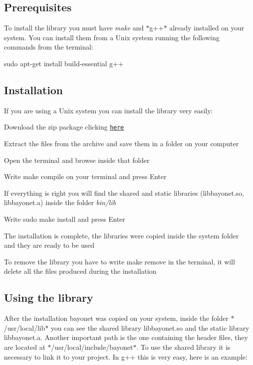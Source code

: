 \subsection*{Prerequisites }

To install the library you must have {\itshape make} and $\ast$g++$\ast$ already installed on your system. You can install them from a Unix system running the following commands from the terminal\-:

{\ttfamily sudo apt-\/get install build-\/essential g++}

\subsection*{Installation }

If you are using a Unix system you can install the library very easily\-:


\begin{DoxyEnumerate}
\item Download the zip package clicking \href{https://github.com/mpatacchiola/bayonet/archive/master.zip}{\tt here}
\item Extract the files from the archive and save them in a folder on your computer
\item Open the terminal and browse inside that folder
\item Write {\ttfamily make compile} on your terminal and press Enter
\item If everything is right you will find the shared and static libraries (libbayonet.\-so, libbayonet.\-a) inside the folder {\itshape bin/lib}
\item Write {\ttfamily sudo make install} and press Enter
\item The installation is complete, the libraries were copied inside the system folder and they are ready to be used
\item To remove the library you have to write {\ttfamily make remove} in the terminal, it will delete all the files produced during the installation
\end{DoxyEnumerate}

\subsection*{Using the library }

After the installation bayonet was copied on your system, inside the folder $\ast$/usr/local/lib$\ast$ you can see the shared library libbayonet.\-so and the static library libbayonet.\-a. Another important path is the one containing the header files, they are located at $\ast$/usr/local/include/bayonet$\ast$. To use the shared library it is necessary to link it to your project. In g++ this is very easy, here is an example\-:

